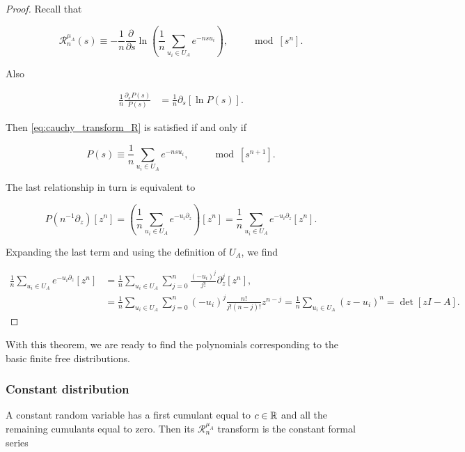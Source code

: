 \begin{proof}
    Recall that

    \begin{equation*}
        \mathcal R_{n}^{\mu_A}(s) \equiv - \frac1n \frac{\partial}{\partial s} \ln \left(\frac1n \sum_{u_i \in U_A} e^{-nsu_i} \right), \qquad \mod [s^n].
    \end{equation*}

    Also 

    \begin{align*}
        \frac1n \frac{\partial_s P(s)}{P(s)} &= \frac1n \partial_s[\ln P(s)].
    \end{align*}

    Then \eqref{eq:cauchy_transform_R} is satisfied if and only if 

    \begin{equation*}
        P(s) \equiv \frac1n \sum_{u_i \in U_A} e^{-nsu_i}, \qquad \mod [s^{n+1}].
    \end{equation*}

    The last relationship in turn is equivalent to 

    \begin{equation*}
        P(n^{-1}\partial_z)[z^n] = \left( \frac1n \sum_{u_i \in U_A} e^{-u_i\partial_z} \right)[z^n] = \frac1n \sum_{u_i \in U_A} e^{-u_i\partial_z}[z^n].
    \end{equation*}

    Expanding the last term and using the definition of $U_A$, we find

    \begin{align*}
        \frac1n \sum_{u_i \in U_A} e^{-u_i\partial_z}[z^n] &=  \frac1n \sum_{u_i \in U_A} \sum_{j=0}^n \frac{(-u_i)^j}{j!} \partial_z^j[z^n],\\
        &= \frac1n \sum_{u_i \in U_A} \sum_{j=0}^n (-u_i)^j \frac{n!}{j!(n-j)!}z^{n-j} = \frac1n \sum_{u_i \in U_A} (z - u_i)^n = \det[zI - A].
    \end{align*}\end{proof}

    With this theorem, we are ready to find the polynomials corresponding to the basic finite free distributions.

\subsubsection{Constant distribution}

A constant random variable has a first cumulant equal to $c \in \mathbb R$ and all the remaining cumulants equal to zero. Then its $\mathcal R_n^{\mu_A}$ transform is the constant formal series

